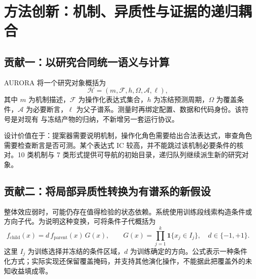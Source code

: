 \section{方法创新：机制、异质性与证据的递归耦合}
\label{sec:innovation}
\subsection{贡献一：以研究合同统一语义与计算}
AURORA 将一个研究对象概括为
\begin{equation}
\mathcal{H}=(m,\mathcal{F},h,\Omega,\mathcal{A},\ell),
\end{equation}
其中 $m$ 为机制描述，$\mathcal{F}$ 为操作化表达式集合，$h$ 为冻结预测周期，$\Omega$ 为覆盖条件，$\mathcal{A}$ 为必要断言，$\ell$ 为父子谱系。测量时再绑定配置、数据和代码身份。该符号是对现有  与冻结产物的归纳，不新增另一套运行协议。

设计价值在于：提案器需要说明机制，操作化角色需要给出合法表达式，审查角色需要检查断言是否可测。某个表达式 IC 较高，并不能跳过该机制必要条件的核对。10 类机制与 7 类形式提供可导航的初始目录，递归队列继续派生新的研究对象。

\begin{center}
\setlength{\fboxsep}{9pt}
\end{center}

\subsection{贡献二：将局部异质性转换为有谱系的新假设}
整体效应弱时，可能仍存在值得检验的状态依赖。系统使用训练段线索构造条件或方向子代。为说明这种变换，可将条件子代概括为
\begin{equation}
 f_{\mathrm{child}}(x)=d\,f_{\mathrm{parent}}(x)\,G(x),\qquad
 G(x)=\prod_{j=1}^{k}\mathbf{1}\{x_j\in I_j\},\quad d\in\{-1,+1\}.
\end{equation}
这里 $I_j$ 为训练选择并冻结的条件区域，$d$ 为训练确定的方向。公式表示一种条件化方式；实际实现还保留覆盖掩码，并支持其他演化操作，不能据此把覆盖外的未知收益填成零。


